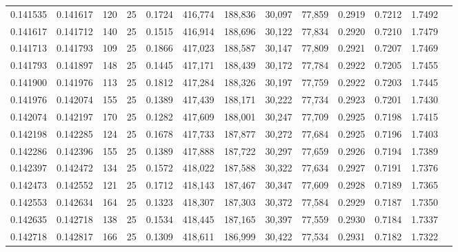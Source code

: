 \begin{tabular}{rrrrrrrrrrrrr}
0.141535 & 0.141617 &   120 &  25 &                                     0.1724 & 416,774 & 188,836 &  30,097 &  77,859 & 0.2919 & 0.7212 & 1.7492 \\
0.141617 & 0.141712 &   140 &  25 &                                     0.1515 & 416,914 & 188,696 &  30,122 &  77,834 & 0.2920 & 0.7210 & 1.7479 \\
0.141713 & 0.141793 &   109 &  25 &                                     0.1866 & 417,023 & 188,587 &  30,147 &  77,809 & 0.2921 & 0.7207 & 1.7469 \\
0.141793 & 0.141897 &   148 &  25 &                                     0.1445 & 417,171 & 188,439 &  30,172 &  77,784 & 0.2922 & 0.7205 & 1.7455 \\
0.141900 & 0.141976 &   113 &  25 &                                     0.1812 & 417,284 & 188,326 &  30,197 &  77,759 & 0.2922 & 0.7203 & 1.7445 \\
0.141976 & 0.142074 &   155 &  25 &                                     0.1389 & 417,439 & 188,171 &  30,222 &  77,734 & 0.2923 & 0.7201 & 1.7430 \\
0.142074 & 0.142197 &   170 &  25 &                                     0.1282 & 417,609 & 188,001 &  30,247 &  77,709 & 0.2925 & 0.7198 & 1.7415 \\
0.142198 & 0.142285 &   124 &  25 &                                     0.1678 & 417,733 & 187,877 &  30,272 &  77,684 & 0.2925 & 0.7196 & 1.7403 \\
0.142286 & 0.142396 &   155 &  25 &                                     0.1389 & 417,888 & 187,722 &  30,297 &  77,659 & 0.2926 & 0.7194 & 1.7389 \\
0.142397 & 0.142472 &   134 &  25 &                                     0.1572 & 418,022 & 187,588 &  30,322 &  77,634 & 0.2927 & 0.7191 & 1.7376 \\
0.142473 & 0.142552 &   121 &  25 &                                     0.1712 & 418,143 & 187,467 &  30,347 &  77,609 & 0.2928 & 0.7189 & 1.7365 \\
0.142553 & 0.142634 &   164 &  25 &                                     0.1323 & 418,307 & 187,303 &  30,372 &  77,584 & 0.2929 & 0.7187 & 1.7350 \\
0.142635 & 0.142718 &   138 &  25 &                                     0.1534 & 418,445 & 187,165 &  30,397 &  77,559 & 0.2930 & 0.7184 & 1.7337 \\
0.142718 & 0.142817 &   166 &  25 &                                     0.1309 & 418,611 & 186,999 &  30,422 &  77,534 & 0.2931 & 0.7182 & 1.7322 \\

\end{tabular}
